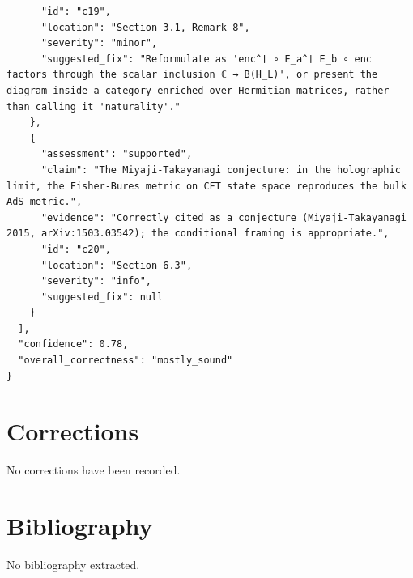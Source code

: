 \documentclass[11pt]{article}
\begin{document}
\begin{verbatim}
      "id": "c19",
      "location": "Section 3.1, Remark 8",
      "severity": "minor",
      "suggested_fix": "Reformulate as 'enc^† ∘ E_a^† E_b ∘ enc factors through the scalar inclusion ℂ → B(H_L)', or present the diagram inside a category enriched over Hermitian matrices, rather than calling it 'naturality'."
    },
    {
      "assessment": "supported",
      "claim": "The Miyaji-Takayanagi conjecture: in the holographic limit, the Fisher-Bures metric on CFT state space reproduces the bulk AdS metric.",
      "evidence": "Correctly cited as a conjecture (Miyaji-Takayanagi 2015, arXiv:1503.03542); the conditional framing is appropriate.",
      "id": "c20",
      "location": "Section 6.3",
      "severity": "info",
      "suggested_fix": null
    }
  ],
  "confidence": 0.78,
  "overall_correctness": "mostly_sound"
}
\end{verbatim}

\section*{Corrections}
No corrections have been recorded.

\section*{Bibliography}
No bibliography extracted.

% 
% 
\end{document}
